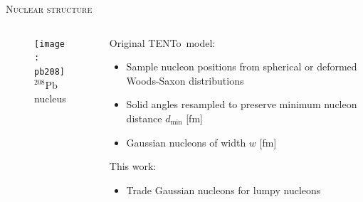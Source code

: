 \documentclass[aspectratio=169]{beamer}
\newcommand{\trento}{T\raisebox{-0.3ex}{R}ENTo}
\begin{document}
\begin{frame}[t]{\scshape Nuclear structure}
  \begin{columns}[T]
    \begin{column}{.4\textwidth}
      \begin{figure}
        \texttt{[image: pb208]}\\
        $^{208}$Pb nucleus
      \end{figure}
    \end{column}
    \begin{column}{.6\textwidth}
      \bigskip
      \textcolor{theme}{Original \trento\ model:}
      \begin{itemize}
        \item Sample nucleon positions from spherical or deformed Woods-Saxon distributions
        \item Solid angles resampled to preserve minimum nucleon distance
          $d_\mathrm{min}$ [fm]
        \item Gaussian nucleons of width $w$ [fm]
      \end{itemize}
      \medskip
      \textcolor{theme}{This work:}
      \begin{itemize}
        \item Trade Gaussian nucleons for lumpy nucleons
      \end{itemize}
    \end{column}
  \end{columns}
\end{frame}
\end{document}

